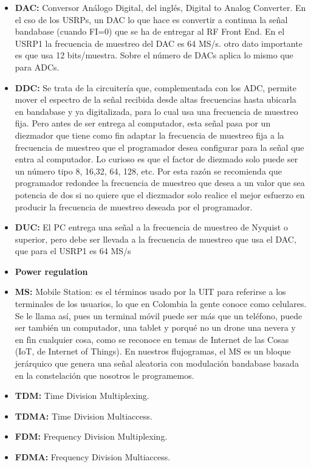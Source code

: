 \begin{itemize}
	\item  \textbf{DAC:} Conversor Análogo Digital, del inglés, Digital to Analog Converter. En el cso de los USRPs, un DAC lo que hace es convertir a continua la señal bandabase (cuando FI=0)  que se ha de entregar al RF Front End. En el USRP1 la frecuencia de muestreo del DAC es 64 MS/s. otro dato importante es que usa 12 bits/muestra. Sobre el número de DACs aplica lo mismo que para ADCs. 
	\item  \textbf{DDC:} Se trata de la circuitería que, complementada con los  ADC, permite mover el espectro de la señal recibida desde altas frecuencias hasta ubicarla en bandabase y ya digitalizada, para lo cual usa una frecuencia de muestreo fija. Pero antes de ser entrega al computador, esta señal pasa por un diezmador que tiene como fin adaptar la frecuencia de muestreo fija a la frecuencia de muestreo que el programador desea configurar para la señal que entra al computador. Lo curioso es que el factor de diezmado solo puede ser un número tipo 8, 16,32, 64, 128, etc. Por esta razón se recomienda que programador redondee la frecuencia de muestreo que desea a un valor que sea potencia de dos si no quiere que el diezmador solo realice el mejor esfuerzo en producir la frecuencia de muestreo deseada por el programador. 
	\item  \textbf{DUC:}  El PC entrega una señal a la frecuencia de muestreo de Nyquist o superior, pero debe ser llevada a la frecuencia de muestreo que usa el DAC, que para el USRP1 es 64 MS/s 
	\item  \textbf{Power regulation }
	\item  \textbf{MS:} Mobile Station: es el términos usado por la UIT para referirse a los terminales de los usuarios, lo que en Colombia la gente conoce como celulares. Se le llama así, pues un terminal móvil puede ser más que un teléfono, puede ser también un computador, una tablet y porqué no un drone una nevera y en fìn cualquier cosa, como se reconoce en temas de Internet de las Cosas (IoT, de Internet of Things). En nuestros flujogramas, el MS es un bloque jerárquico que genera una señal aleatoria con modulación bandabase basada en la constelación que nosotros le programemos.
	\item   \textbf{TDM:} Time Division Multiplexing.
	\item  \textbf{TDMA:} Time Division Multiaccess.
	\item  \textbf{FDM:} Frequency Division Multiplexing.
	\item  \textbf{FDMA:} Frequency Division Multiaccess.

\end{itemize}
